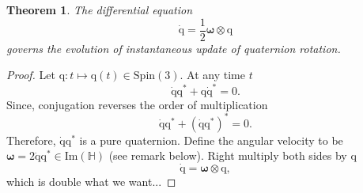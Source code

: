 \documentclass{amsart}
\newtheorem{theorem}{Theorem}[section]
\theoremstyle{definition}
\theoremstyle{remark}
\numberwithin{equation}{section}
\begin{document}
\begin{theorem}
  The differential equation
  \begin{equation}
    \mathrm{\dot{q}} = \frac{1}{2}
    \boldsymbol\omega \otimes
    \mathrm{q}
  \end{equation}
  governs the evolution of instantaneous update of quaternion rotation.
\end{theorem}
\begin{proof}
  Let $\mathrm{q}: t \mapsto \mathrm{q}(t)\in\mathrm{Spin}(3)$.
  At any time $t$
  \begin{equation}
    \mathrm{\dot{q}}\mathrm{q}^* + \mathrm{q}\mathrm{\dot{q}}^* = 0. \nonumber
  \end{equation}
  Since, conjugation reverses the order of multiplication
  \begin{equation}
    \mathrm{\dot{q}}\mathrm{q}^* + (\mathrm{\dot{q}}\mathrm{q}^*)^* = 0. \nonumber
  \end{equation}
  Therefore, $\mathrm{\dot{q}}\mathrm{q}^*$ is a pure quaternion.
  Define the angular velocity to be $\boldsymbol\omega = 2\mathrm{\dot{q}}\mathrm{q}^*\in\mathrm{Im}(\mathbb{H})$ (see remark below).
  Right multiply both sides by $\mathrm{q}$
  \begin{equation}
    \mathrm{\dot{q}} = \boldsymbol\omega \otimes \mathrm{q}, \nonumber
  \end{equation}
  which is double what we want...
\end{proof}
\end{document}
